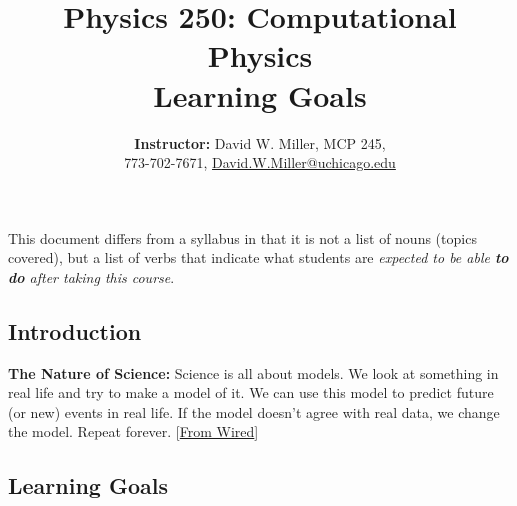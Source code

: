 \documentclass[12pt]{article}
\title{\sc Physics 250: Computational Physics\\Learning Goals}
\author{\textbf{Instructor:} David W. Miller, MCP 245, \\ 773-702-7671, \href{mailto:David.W.Miller@uchicago.edu}{David.W.Miller@uchicago.edu}}
\date{}
\begin{document}
\maketitle

\thispagestyle{fancy}


\noindent This document differs from a syllabus in that it is not a list of nouns (topics covered), but a list of verbs that indicate what students are \textit{expected to be able \textbf{to do} after taking this course}.

\subsection*{Introduction}

\textbf{The Nature of Science:} Science is all about models. We look at something in real life and try to make a model of it. We can use this model to predict future (or new) events in real life. If the model doesn't agree with real data, we change the model. Repeat forever. [\href{https://www.wired.com/2015/11/what-computational-physics-is-really-about/}{From Wired}]

\subsection*{Learning Goals}
\end{document}
